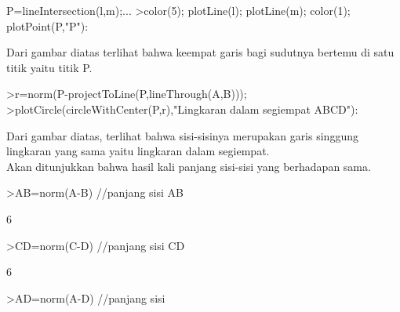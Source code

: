 \documentclass[a4paper,10pt]{article}
\begin{document}
\begin{eulernotebook}
\begin{eulercomment}
\begin{eulercomment}
\begin{eulercomment}
\begin{eulercomment}
\begin{eulercomment}
\begin{eulercomment}
\begin{eulercomment}
\begin{eulercomment}
\begin{eulercomment}
\begin{eulercomment}
\begin{eulercomment}
\begin{eulercomment}
\begin{eulercomment}
\begin{eulercomment}
\begin{eulercomment}
\begin{eulercomment}
\begin{eulercomment}
\begin{eulercomment}
\begin{eulercomment}
\begin{eulercomment}
\begin{eulercomment}
\begin{eulercomment}
\begin{eulercomment}
\begin{eulercomment}
\begin{eulercomment}
\begin{eulercomment}
\begin{eulercomment}
\begin{eulercomment}
\begin{eulercomment}
\begin{eulercomment}
\begin{eulercomment}
\begin{eulercomment}
\begin{eulercomment}
\begin{eulercomment}
\begin{eulercomment}
\begin{eulercomment}
\begin{eulercomment}
\begin{eulercomment}
\begin{eulercomment}
\begin{eulercomment}
\begin{eulercomment}
\begin{eulercomment}
\begin{eulercomment}
\begin{eulercomment}
\begin{eulercomment}
\begin{eulercomment}
\begin{eulercomment}
\begin{eulercomment}
\begin{eulercomment}
\begin{eulercomment}
\begin{eulercomment}
\begin{eulercomment}
\begin{eulercomment}
\begin{eulercomment}
\begin{eulercomment}
\begin{eulercomment}
\begin{eulercomment}
\begin{eulercomment}
\begin{eulercomment}
\begin{eulercomment}
\begin{eulercomment}
\begin{eulercomment}
\begin{eulercomment}
\begin{eulercomment}
\begin{eulerprompt}
P=lineIntersection(l,m);...
>color(5); plotLine(l); plotLine(m); color(1); plotPoint(P,"P"):
\end{eulerprompt}
\begin{eulercomment}
Dari gambar diatas terlihat bahwa keempat garis bagi sudutnya bertemu
di satu titik yaitu titik P.
\end{eulercomment}
\begin{eulerprompt}
>r=norm(P-projectToLine(P,lineThrough(A,B)));
>plotCircle(circleWithCenter(P,r),"Lingkaran dalam segiempat ABCD"):
\end{eulerprompt}
\begin{eulercomment}
Dari gambar diatas, terlihat bahwa sisi-sisinya merupakan garis
singgung lingkaran yang sama yaitu lingkaran dalam segiempat.\\
Akan ditunjukkan bahwa hasil kali panjang sisi-sisi yang berhadapan
sama.
\end{eulercomment}
\begin{eulerprompt}
>AB=norm(A-B) //panjang sisi AB
\end{eulerprompt}
\begin{euleroutput}
  6
\end{euleroutput}
\begin{eulerprompt}
>CD=norm(C-D) //panjang sisi CD
\end{eulerprompt}
\begin{euleroutput}
  6
\end{euleroutput}
\begin{eulerprompt}
>AD=norm(A-D) //panjang sisi 
\end{eulerprompt}
\end{eulercomment}
\end{eulercomment}
\end{eulercomment}
\end{eulercomment}
\end{eulercomment}
\end{eulercomment}
\end{eulercomment}
\end{eulercomment}
\end{eulercomment}
\end{eulercomment}
\end{eulercomment}
\end{eulercomment}
\end{eulercomment}
\end{eulercomment}
\end{eulercomment}
\end{eulercomment}
\end{eulercomment}
\end{eulercomment}
\end{eulercomment}
\end{eulercomment}
\end{eulercomment}
\end{eulercomment}
\end{eulercomment}
\end{eulercomment}
\end{eulercomment}
\end{eulercomment}
\end{eulercomment}
\end{eulercomment}
\end{eulercomment}
\end{eulercomment}
\end{eulercomment}
\end{eulercomment}
\end{eulercomment}
\end{eulercomment}
\end{eulercomment}
\end{eulercomment}
\end{eulercomment}
\end{eulercomment}
\end{eulercomment}
\end{eulercomment}
\end{eulercomment}
\end{eulercomment}
\end{eulercomment}
\end{eulercomment}
\end{eulercomment}
\end{eulercomment}
\end{eulercomment}
\end{eulercomment}
\end{eulercomment}
\end{eulercomment}
\end{eulercomment}
\end{eulercomment}
\end{eulercomment}
\end{eulercomment}
\end{eulercomment}
\end{eulercomment}
\end{eulercomment}
\end{eulercomment}
\end{eulercomment}
\end{eulercomment}
\end{eulercomment}
\end{eulercomment}
\end{eulercomment}
\end{eulercomment}
\end{eulernotebook}
\end{document}
